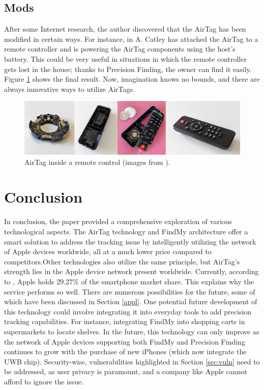 \documentclass[english]{article}
\begin{document}
\subsection{Mods}
After some Internet research, the author discovered that the AirTag has been modified in certain ways. For instance, in \cite{telecomando} A. Catley has attached the AirTag to a remote controller and is powering the AirTag components using the host's battery. This could be very useful in situations in which the remote controller gets lost in the house; thanks to Precision Finding, the owner can find it easily. Figure \ref{img:controller} shows the final result.
Now, imagination knows no bounds, and there are always innovative ways to utilize AirTags.
\begin{figure}[]
	\centering
	\includegraphics[width=\textwidth]{images/remote.jpg}
	\caption{AirTag inside a remote control (images from \cite{reverse}).}
	\label{img:controller}
\end{figure}


\section{Conclusion}
In conclusion, the paper provided a comprehensive exploration of various technological aspects. The AirTag technology and FindMy architecture offer a smart solution to address the tracking issue by intelligently utilizing the network of Apple devices worldwide, all at a much lower price compared to competitors.Other technologies also utilize the same principle, but AirTag's strength lies in the Apple device network present worldwide. Currently, according to \cite{Lin}, Apple holds $29.27\%$ of the smartphone market share. This explains why the service performs so well. There are numerous possibilities for the future, some of which have been discussed in Section \ref{appl}. One potential future development of this technology could involve integrating it into everyday tools to add precision tracking capabilities. For instance, integrating FindMy into shopping carts in supermarkets to locate shelves. In the future, this technology can only improve as the network of Apple devices supporting both FindMy and Precision Finding continues to grow with the purchase of new iPhones (which now integrate the UWB chip). Security-wise, vulnerabilities highlighted in Section \ref{sec:vuln} need to be addressed, as user privacy is paramount, and a company like Apple cannot afford to ignore the issue.
\printbibliography
\nocite{*}
\end{document}
